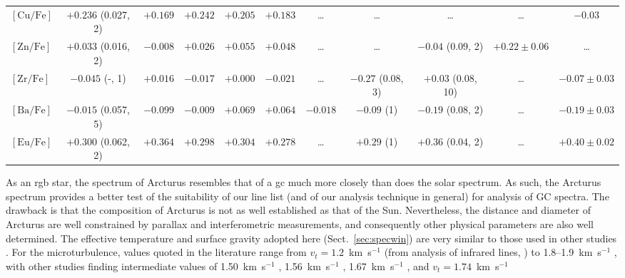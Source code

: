 \documentclass{aa}
\begin{document}
\begin{table*}
\begin{adjustbox}{width=1\textwidth}
\begin{tabular}{l c c c c c c c c c c}
$\mathrm{[Cu/Fe]}$ & $+0.236$ (0.027, 2) & $+0.169$ & $+0.242$ & $+0.205$ & $+0.183$ & \ldots & \ldots & \ldots & \ldots & $-0.03$ \\
$\mathrm{[Zn/Fe]}$ & $+0.033$ (0.016, 2) & $-0.008$  & $+0.026$ & $+0.055$ & $+0.048$ & \ldots & \ldots & $-0.04$ (0.09, 2) & $+0.22\pm0.06$ & \ldots \\
$\mathrm{[Zr/Fe]}$ & $-0.045$ (-, 1) & $+0.016$  & $-0.017$ & $+0.000$ & $-0.021$ & \ldots & $-0.27$ (0.08, 3) & $+0.03$ (0.08, 10) & \ldots & $-0.07\pm0.03$ \\
$\mathrm{[Ba/Fe]}$ & $-0.015$ (0.057, 5) & $-0.099$  & $-0.009$ & $+0.069$ & $+0.064$ & $-0.018$ & $-0.09$ (1) & $-0.19$ (0.08, 2) & \ldots & $-0.19\pm0.03$ \\
$\mathrm{[Eu/Fe]}$ & $+0.300$ (0.062, 2) & $+0.364$  & $+0.298$ & $+0.304$ & $+0.278$ & \ldots & $+0.29$ (1) & $+0.36$ (0.04, 2) & \ldots & $+0.40\pm0.02$ \\
\hline
\end{tabular}
\end{adjustbox}
\end{table*}

As an \ac{rgb} star, the spectrum of Arcturus resembles that of a \ac{gc} much more closely than does the solar spectrum. As such, the Arcturus spectrum provides a better test of the suitability of our line list (and of our analysis technique in general) for analysis of GC spectra. 
The drawback is that the composition of Arcturus is not as well established as that of the Sun.
Nevertheless,
the distance and diameter of Arcturus are well constrained by parallax and interferometric measurements, and consequently other physical parameters are also well determined. 
The effective temperature and surface gravity adopted here (Sect.~\ref{sec:specwin}) are very similar to those used in other studies \citep[e.g.][]{Fulbright2006,Worley2009}.
For the microturbulence, values quoted in the literature range from $v_t=1.2$~km~s$^{-1}$ (from analysis of infrared lines, \citealt{Kondo2019}) to 1.8--1.9~km~s$^{-1}$ \citep[vdS2013]{vanderSwaelmen2013}, with other studies finding intermediate values of 1.50~km~s$^{-1}$ \citep[W2009]{Worley2009}, 1.56~km~s$^{-1}$ \citep[Y2005]{Yong2005}, 1.67~km~s$^{-1}$ \citep{Fulbright2006}, and $v_t=1.74$~km~s$^{-1}$
\citep[RA2011]{Ramirez2011} 
\end{document}
